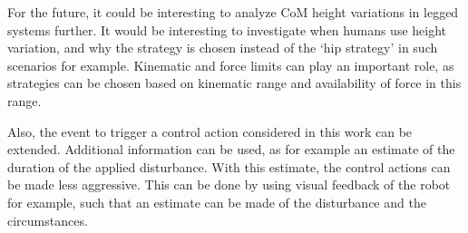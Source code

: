 For the future, it could be interesting to analyze \ac{CoM} height variations in legged systems further. It would be interesting to investigate when humans use height variation, and why the strategy is chosen instead of the `hip strategy' in such scenarios for example. Kinematic and force limits can play an important role, as strategies can be chosen based on kinematic range and availability of force in this range.

Also, the event to trigger a control action considered in this work can be extended. Additional information can be used, as for example an estimate of the duration of the applied disturbance. With this estimate, the control actions can be made less aggressive. This can be done by using visual feedback of the robot for example, such that an estimate can be made of the disturbance and the circumstances. 
